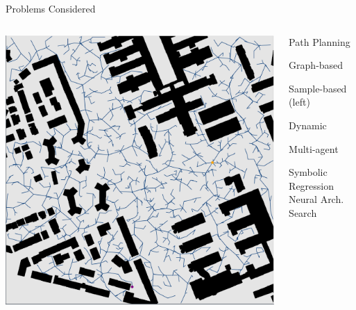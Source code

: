 \documentclass[aspectratio=169]{beamer}
\begin{document}
\begin{frame}[plain]{Problems Considered}
  \begin{columns}[T]
      \begin{column}{.5\linewidth}
          \includegraphics[width=1.0\linewidth, keepaspectratio]{figures/one_off.pdf}
      \end{column}
      \begin{column}{.5\linewidth}
          {\Huge Path Planning}
          \begin{vfilleditems}
              \item {\Large Graph-based}
              \vspace{1em}
              \item {\Large Sample-based \Medium (left)}
              \vspace{1em}
              \item {\color{grey} {\Large Dynamic}}
              \vspace{1em}
              \item {\color{grey} {\Large Multi-agent}}
          \end{vfilleditems}
          \vspace{1em}
          {\color{grey} {\Large Symbolic Regression}}
          \vspace{1em}
          {\color{grey} {\Large Neural Arch. Search}}
      \end{column}
  \end{columns}
\end{frame}
\end{document}
